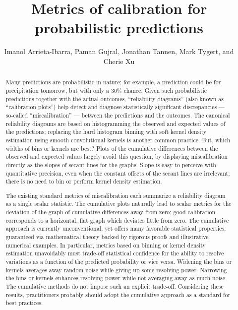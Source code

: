 \documentclass{article}
\title{Metrics of calibration for probabilistic predictions}
\author{Imanol Arrieta-Ibarra, Paman Gujral, Jonathan Tannen, Mark Tygert,
and Cherie Xu}
\begin{document}
\maketitle



\begin{abstract}
Many predictions are probabilistic in nature; for example,
a prediction could be for precipitation tomorrow, but with only a 30\% chance.
Given such probabilistic predictions together with the actual outcomes,
``reliability diagrams'' (also known as ``calibration plots'') help detect
and diagnose statistically significant discrepancies
--- so-called ``miscalibration'' ---
between the predictions and the outcomes.
The canonical reliability diagrams are based on histogramming
the observed and expected values of the predictions;
replacing the hard histogram binning with soft kernel density estimation
using smooth convolutional kernels is another common practice.
But, which widths of bins or kernels are best?
Plots of the cumulative differences between the observed and expected values
largely avoid this question, by displaying miscalibration directly
as the slopes of secant lines for the graphs. Slope is easy to perceive
with quantitative precision, even when the constant offsets
of the secant lines are irrelevant; there is no need to bin
or perform kernel density estimation.

The existing standard metrics of miscalibration each summarize
a reliability diagram as a single scalar statistic.
The cumulative plots naturally lead to scalar metrics
for the deviation of the graph of cumulative differences away from zero;
good calibration corresponds to a horizontal, flat graph
which deviates little from zero.
The cumulative approach is currently unconventional,
yet offers many favorable statistical properties,
guaranteed via mathematical theory backed by rigorous proofs
and illustrative numerical examples.
In particular, metrics based on binning or kernel density estimation
unavoidably must trade-off statistical confidence
for the ability to resolve variations as a function
of the predicted probability or vice versa.
Widening the bins or kernels averages away random noise
while giving up some resolving power.
Narrowing the bins or kernels enhances resolving power
while not averaging away as much noise.
The cumulative methods do not impose such an explicit trade-off.
Considering these results, practitioners probably should adopt
the cumulative approach as a standard for best practices.
\end{abstract}
\end{document}
